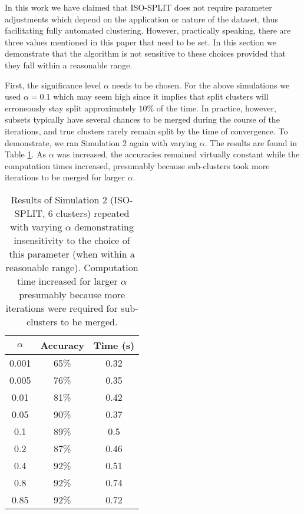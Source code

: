 \documentclass[10pt]{article}
\begin{document}
In this work we have claimed that ISO-SPLIT does not require parameter adjustments which depend on the application or nature of the dataset, thus facilitating fully automated clustering. However, practically speaking, there are three values mentioned in this paper that need to be set. In this section we demonstrate that the algorithm is not sensitive to these choices provided that they fall within a reasonable range.

First, the significance level $\alpha$ needs to be chosen. For the above simulations we used $\alpha=0.1$ which may seem high since it implies that split clusters will erroneously stay split approximately $10\%$ of the time. In practice, however, subsets typically have several chances to be merged during the course of the iterations, and true clusters rarely remain split by the time of convergence. To demonstrate, we ran Simulation 2 again with varying $\alpha$. The results are found in Table \ref{table:alpha_dependence}. As $\alpha$ was increased, the accuracies remained virtually constant while the computation times increased, presumably because sub-clusters took more iterations to be merged for larger $\alpha$.


  \begin{table}[t]
\centering
    \begin{tabular}{c|c|c|}
	\textbf{$\alpha$} & \textbf{Accuracy} & \textbf{Time (s)} \\
	\hline
	0.001 & 65\% & 0.32 \\
0.005 & 76\% & 0.35 \\
0.01 & 81\% & 0.42 \\
0.05 & 90\% & 0.37 \\
0.1 & 89\% & 0.5 \\
0.2 & 87\% & 0.46 \\
0.4 & 92\% & 0.51 \\
0.8 & 92\% & 0.74 \\
0.85 & 92\% & 0.72 \\
\end{tabular}
\caption{
\label{table:alpha_dependence}
Results of Simulation 2 (ISO-SPLIT, 6 clusters) repeated with varying $\alpha$ demonstrating insensitivity to the choice of this parameter (when within a reasonable range). Computation time increased for larger $\alpha$ presumably because more iterations were required for sub-clusters to be merged.
}
\end{table}
\end{document}
